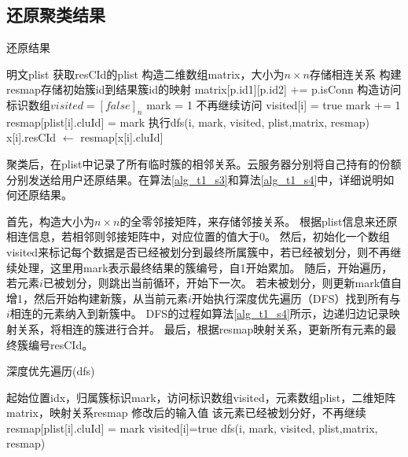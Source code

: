 \subsection{还原聚类结果}
\label{task1-huanyuan}
\begin{algorithm}[htbp]
	\renewcommand{\algorithmicrequire}{\textbf{输入:}}
	\renewcommand{\algorithmicensure}{\textbf{输出:}}
	\caption{还原结果}
	\label{alg_t1_s3}
	\begin{algorithmic}[1]
		\REQUIRE 明文plist
		\ENSURE 获取resCId的plist
		\STATE 构造二维数组matrix，大小为$ n\times n $存储相连关系
		\STATE 构建resmap存储初始簇id到结果簇id的映射
		\STATE matrix[p.id1][p.id2] += p.isConn
		\ENDFOR
		\STATE 构造访问标识数组$ visited=[false]_n $
		\STATE mark = 1
		\STATE 不再继续访问
		\ENDIF
		\STATE visited[i] = true
		\STATE mark += 1
		\STATE resmap[plist[i].cluId] = mark
		\STATE 执行dfs(i, mark, visited, plist,matrix, resmap)
		\ENDFOR
		\STATE x[i].resCId $\leftarrow$ resmap[x[i].cluId]
		\ENDIF
		\ENDFOR
	\end{algorithmic}
\end{algorithm}
聚类后，在plist中记录了所有临时簇的相邻关系。云服务器分别将自己持有的份额分别发送给用户还原结果。在算法\ref{alg_t1_s3}和算法\ref{alg_t1_s4}中，详细说明如何还原结果。

首先，构造大小为$ n \times n $的全零邻接矩阵，来存储邻接关系。
根据plist信息来还原相连信息，若相邻则邻接矩阵中，对应位置的值大于0。
然后，初始化一个数组visited来标记每个数据是否已经被划分到最终所属簇中，若已经被划分，则不再继续处理，这里用mark表示最终结果的簇编号，自1开始累加。
随后，开始遍历，若元素$i$已被划分，则跳出当前循环，开始下一次。
若未被划分，则更新mark值自增1，然后开始构建新簇，从当前元素$ i $开始执行深度优先遍历（DFS）找到所有与$ i $相连的元素纳入到新簇中。
DFS的过程如算法\ref{alg_t1_s4}所示，边递归边记录映射关系，将相连的簇进行合并。
最后，根据resmap映射关系，更新所有元素的最终簇编号resCId。
\begin{algorithm}[htbp]
	\renewcommand{\algorithmicrequire}{\textbf{输入:}}
	\renewcommand{\algorithmicensure}{\textbf{输出:}}
	\caption{深度优先遍历(dfs)}
	\label{alg_t1_s4}
	\begin{algorithmic}[1]
		\REQUIRE 起始位置idx，归属簇标识mark，访问标识数组visited，元素数组plist，二维矩阵matrix，映射关系resmap
		\ENSURE 修改后的输入值
		\STATE 该元素已经被划分好，不再继续
		\ENDIF
		\STATE resmap[plist[i].cluId] = mark
		\STATE visited[i]=true
		\STATE dfs(i, mark, visited, plist,matrix, resmap)
		\ENDIF
		\ENDFOR
	\end{algorithmic}
\end{algorithm}

